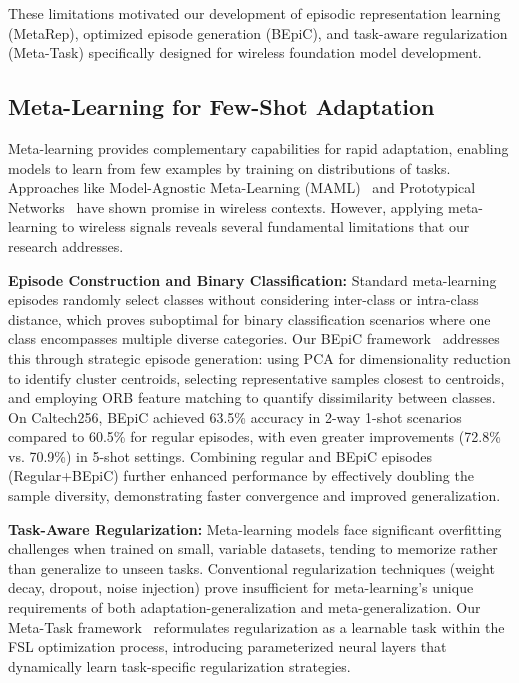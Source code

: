 These limitations motivated our development of episodic representation learning (MetaRep), optimized episode generation (BEpiC), and task-aware regularization (Meta-Task) specifically designed for wireless foundation model development.

\subsection{Meta-Learning for Few-Shot Adaptation}

Meta-learning provides complementary capabilities for rapid adaptation, enabling models to learn from few examples by training on distributions of tasks. Approaches like Model-Agnostic Meta-Learning (MAML)~\cite{finn2017model} and Prototypical Networks~\cite{snell2017prototypical} have shown promise in wireless contexts. However, applying meta-learning to wireless signals reveals several fundamental limitations that our research addresses.

\textbf{Episode Construction and Binary Classification:} Standard meta-learning episodes randomly select classes without considering inter-class or intra-class distance, which proves suboptimal for binary classification scenarios where one class encompasses multiple diverse categories. Our BEpiC framework~\cite{} addresses this through strategic episode generation: using PCA for dimensionality reduction to identify cluster centroids, selecting representative samples closest to centroids, and employing ORB feature matching to quantify dissimilarity between classes. On Caltech256, BEpiC achieved 63.5\% accuracy in 2-way 1-shot scenarios compared to 60.5\% for regular episodes, with even greater improvements (72.8\% vs. 70.9\%) in 5-shot settings. Combining regular and BEpiC episodes (Regular+BEpiC) further enhanced performance by effectively doubling the sample diversity, demonstrating faster convergence and improved generalization.

\textbf{Task-Aware Regularization:} Meta-learning models face significant overfitting challenges when trained on small, variable datasets, tending to memorize rather than generalize to unseen tasks. Conventional regularization techniques (weight decay, dropout, noise injection) prove insufficient for meta-learning's unique requirements of both adaptation-generalization and meta-generalization. Our Meta-Task framework~\cite{} reformulates regularization as a learnable task within the FSL optimization process, introducing parameterized neural layers that dynamically learn task-specific regularization strategies.


